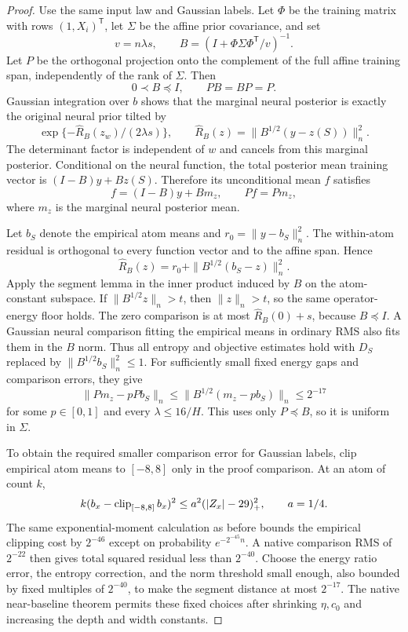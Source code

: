 \begin{proof}
Use the same input law and Gaussian labels. Let $\Phi$ be the training matrix with rows $(1,X_i)^{\mathsf T}$, let $\Sigma$ be the affine prior covariance, and set
\[
 v=n\lambda s,\qquad
 B=(I+\Phi\Sigma\Phi^{\mathsf T}/v)^{-1}.
\]
Let $P$ be the orthogonal projection onto the complement of the full affine training span, independently of the rank of $\Sigma$. Then
\[
 0\prec B\preceq I,\qquad PB=BP=P.
\]
Gaussian integration over $b$ shows that the marginal neural posterior is exactly the original neural prior tilted by
\[
 \exp\{-\widehat R_B(z_w)/(2\lambda s)\},\qquad
 \widehat R_B(z)=\|B^{1/2}(y-z(S))\|_n^2.
\]
The determinant factor is independent of $w$ and cancels from this marginal posterior. Conditional on the neural function, the total posterior mean training vector is
$(I-B)y+Bz(S)$. Therefore its unconditional mean $f$ satisfies
\begin{equation}
 f=(I-B)y+Bm_z,\qquad Pf=Pm_z,
 \label{eq:affine-marginal-mean}
\end{equation}
where $m_z$ is the marginal neural posterior mean.

Let $b_S$ denote the empirical atom means and $r_0=\|y-b_S\|_n^2$. The within-atom residual is orthogonal to every function vector and to the affine span. Hence
\[
 \widehat R_B(z)=r_0+\|B^{1/2}(b_S-z)\|_n^2.
\]
Apply the segment lemma in the inner product induced by $B$ on the atom-constant subspace. If $\|B^{1/2}z\|_n>t$, then $\|z\|_n>t$, so the same operator-energy floor holds. The zero comparison is at most $\widehat R_B(0)+s$, because $B\preceq I$. A Gaussian neural comparison fitting the empirical means in ordinary RMS also fits them in the $B$ norm. Thus all entropy and objective estimates hold with $D_S$ replaced by $\|B^{1/2}b_S\|_n^2\le1$. For sufficiently small fixed energy gaps and comparison errors, they give
\[
 \|P m_z-pP b_S\|_n
 \le\|B^{1/2}(m_z-pb_S)\|_n\le2^{-17}
\]
for some $p\in[0,1]$ and every $\lambda\le16/H$. This uses only $P\preceq B$, so it is uniform in $\Sigma$.

To obtain the required smaller comparison error for Gaussian labels, clip empirical atom means to $[-8,8]$ only in the proof comparison. At an atom of count $k$,
\[
 k(b_x-\operatorname{clip}_{[-8,8]}b_x)^2
 \le a^2(|Z_x|-29)_+^2,\qquad a=1/4.
\]
The same exponential-moment calculation as before bounds the empirical clipping cost by $2^{-46}$ except on probability $e^{-2^{-45}n}$. A native comparison RMS of $2^{-22}$ then gives total squared residual less than $2^{-40}$. Choose the energy ratio error, the entropy correction, and the norm threshold small enough, also bounded by fixed multiples of $2^{-40}$, to make the segment distance at most $2^{-17}$. The native near-baseline theorem permits these fixed choices after shrinking $\eta,c_0$ and increasing the depth and width constants.


\end{proof}
